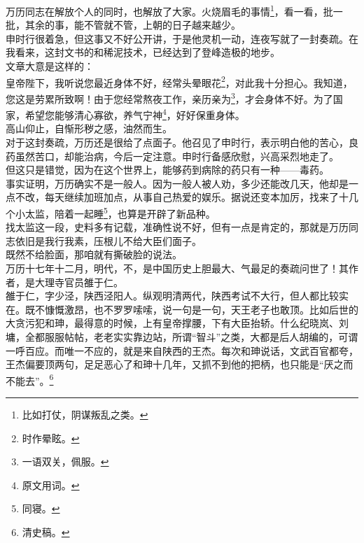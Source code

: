 \begin{multicols}{\theparacolNo}
万历同志在解放个人的同时，也解放了大家。火烧眉毛的事情\footnote{比如打仗，阴谋叛乱之类。}，看一看，批一批，其余的事，能不管就不管，上朝的日子越来越少。\\

申时行很着急，但这事又不好公开讲，于是他灵机一动，连夜写就了一封奏疏。在我看来，这封文书的和稀泥技术，已经达到了登峰造极的地步。\\

文章大意是这样的：\\

皇帝陛下，我听说您最近身体不好，经常头晕眼花\footnote{时作晕眩。}，对此我十分担心。我知道，您这是劳累所致啊！由于您经常熬夜工作，亲历亲为\footnote{一语双关，佩服。}，才会身体不好。为了国家，希望您能够清心寡欲，养气宁神\footnote{原文用词。}，好好保重身体。\\

高山仰止，自惭形秽之感，油然而生。\\

对于这封奏疏，万历还是很给了点面子。他召见了申时行，表示明白他的苦心，良药虽然苦口，却能治病，今后一定注意。申时行备感欣慰，兴高采烈地走了。\\

但这只是错觉，因为在这个世界上，能够药到病除的药只有一种——毒药。\\

事实证明，万历确实不是一般人。因为一般人被人劝，多少还能改几天，他却是一点不改，每天继续加班加点，从事自己热爱的娱乐。据说还变本加厉，找来了十几个小太监，陪着一起睡\footnote{同寝。}，也算是开辟了新品种。\\

找太监这一段，史料多有记载，准确性说不好，但有一点是肯定的，那就是万历同志依旧是我行我素，压根儿不给大臣们面子。\\

既然不给脸面，那咱就有撕破脸的说法。\\

万历十七年十二月，明代，不，是中国历史上胆最大、气最足的奏疏问世了！其作者，是大理寺官员雒于仁。\\

雒于仁，字少泾，陕西泾阳人。纵观明清两代，陕西考试不大行，但人都比较实在。既不慷慨激昂，也不罗罗嗦嗦，说一句是一句，天王老子也敢顶。比如后世的大贪污犯和珅，最得意的时候，上有皇帝撑腰，下有大臣抬轿。什么纪晓岚、刘墉，全都服服帖帖，老老实实靠边站，所谓“智斗”之类，大都是后人胡编的，可谓一呼百应。而唯一不应的，就是来自陕西的王杰。每次和珅说话，文武百官都夸，王杰偏要顶两句，足足恶心了和珅十几年，又抓不到他的把柄，也只能是“厌之而不能去”。\footnote{清史稿。}\\


\end{multicols}
